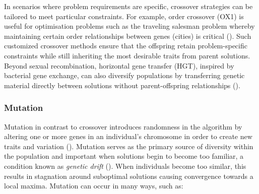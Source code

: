 \noindent In scenarios where problem requirements are specific, crossover strategies can be tailored to meet particular constraints. For example, order crossover (OX1) is useful for optimisation problems such as the traveling salesman problem whereby maintaining certain order relationships between genes (cities) is critical (\cite{tsp}). Such customized crossover methods ensure that the offspring retain problem-specific constraints while still inheriting the most desirable traits from parent solutions. Beyond sexual recombination, horizontal gene transfer (HGT), inspired by bacterial gene exchange, can also diversify populations by transferring genetic material directly between solutions without parent-offspring relationships (\cite{hgt}). \bigskip

\subsubsection{Mutation}\label{sec:ea_mutation}
Mutation in contrast to crossover introduces randomness in the algorithm by altering one or more genes in an individual's chromosome in order to create new traits and variation (\cite{evolutionaryComputingAndNeuralNetworks}). Mutation serves as the primary source of diversity within the population and important when solutions begin to become too familiar, a condition known as \textit{genetic drift} (\cite{advancesInEvolutionaryAlgorithms}). When individuals become too similar, this results in stagnation around suboptimal solutions causing convergence towards a local maxima. Mutation can occur in many ways, such as:


